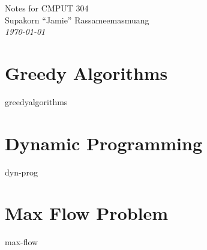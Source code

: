 \documentclass{report}
\begin{document}
\begin{titlepage}
    \centering
    \vspace*{5cm}
    {
    \Large
    Notes for CMPUT 304\\
    }
    {
    \vspace{3cm}
    Supakorn ``Jamie'' Rassameemasmuang \\
    \vspace{0.5cm}
    \textit{\today}
    }
\end{titlepage}

\tableofcontents

    \chapter{Greedy Algorithms}
    {greedyalgorithms}

    \chapter{Dynamic Programming}
    {dyn-prog}

    \chapter{Max Flow Problem}
    {max-flow}
\end{document}
